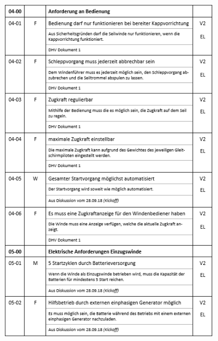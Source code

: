 \begin{figure}[H]
	\begin{center}
		\includegraphics[width=155mm]{appendix/Anforderungen4.png}
	\end{center}
\end{figure}

